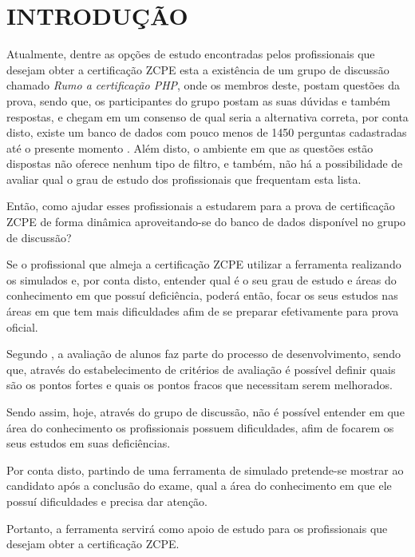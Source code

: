 \chapter{INTRODUÇÃO}
\label{chp:intro}

Atualmente, dentre as opções de estudo encontradas pelos
profissionais que desejam obter a certificação \ac{ZCPE} esta a existência de um
grupo de discussão chamado \textit{Rumo a certificação PHP}, onde os membros
deste, postam questões da prova, sendo que, os participantes do grupo postam as 
suas dúvidas e também respostas, e chegam em um consenso de qual seria a 
alternativa correta, por conta disto, existe um banco de dados com pouco menos 
de 1450 perguntas cadastradas até o presente momento 
\cite{googleGroupsRumoACertificaoPHP}. Além disto, o ambiente em que as 
questões estão dispostas não oferece nenhum tipo de filtro, e também, não há a
possibilidade de avaliar qual o grau de estudo dos profissionais que frequentam 
esta lista.

Então, como ajudar esses profissionais a estudarem para a prova de certificação
\acs{ZCPE} de forma dinâmica aproveitando-se do banco de dados disponível no
grupo de discussão?


Se o profissional que almeja a certificação \acs{ZCPE} utilizar a ferramenta
realizando os simulados e, por conta disto, entender qual é o seu grau de estudo e áreas 
do conhecimento em que possuí deficiência, poderá então, focar os seus estudos 
nas áreas em que tem mais dificuldades afim de se preparar efetivamente para 
prova oficial.


Segundo , a avaliação de 
alunos faz parte do processo de desenvolvimento, sendo que, através do estabelecimento 
de critérios de avaliação é possível definir quais são os pontos fortes e quais
os pontos fracos que necessitam serem melhorados.

Sendo assim, hoje, através do grupo de discussão, não é possível entender em 
que área do conhecimento os profissionais possuem dificuldades, afim de focarem
os seus estudos em suas deficiências.

Por conta disto, partindo de uma ferramenta de simulado pretende-se mostrar ao
candidato após a conclusão do exame, qual a área do conhecimento em que ele 
possuí dificuldades e precisa dar atenção.

Portanto, a ferramenta servirá como apoio de
estudo para os profissionais que desejam obter a certificação \acs{ZCPE}.

